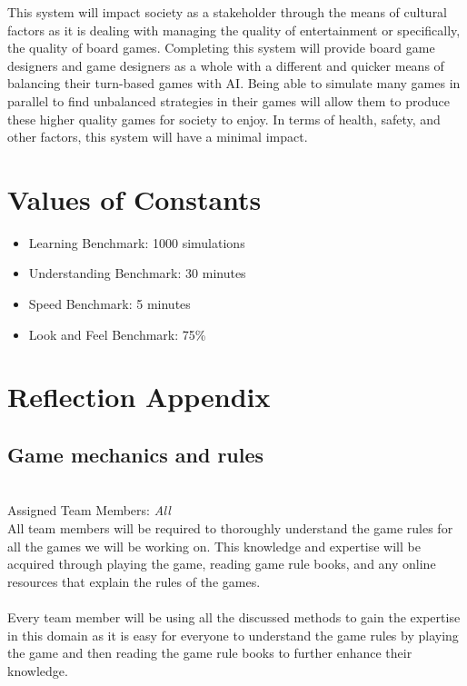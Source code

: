 \documentclass[12pt]{article}
\begin{document}
This system will impact society as a stakeholder through the means of cultural factors as it is dealing with managing the quality of entertainment or specifically, the quality of board games. Completing this system will provide board game designers and game designers as a whole with a different and quicker means of balancing their turn-based games with AI. Being able to simulate many games in parallel to find unbalanced strategies in their games will allow them to produce these higher quality games for society to enjoy. In terms of health, safety, and other factors, this system will have a minimal impact.

\section{Values of Constants}
\begin{itemize}
\item Learning Benchmark: 1000 simulations
\item Understanding Benchmark: 30 minutes
\item Speed Benchmark: 5 minutes
\item Look and Feel Benchmark: 75\%

\end{itemize}

\section{Reflection Appendix}
\subsection{Game mechanics and rules}
\\
Assigned Team Members: \textit{All}
\\
All team members will be required to thoroughly understand the game rules for all the games we will be working on. This knowledge and expertise will be acquired through playing the game, reading game rule books, and any online resources that explain the rules of the games.
\\\\
Every team member will be using all the discussed methods to gain the expertise in this domain as it is easy for everyone to understand the game rules by playing the game and then reading the game rule books to further enhance their knowledge.

\\
\end{document}
